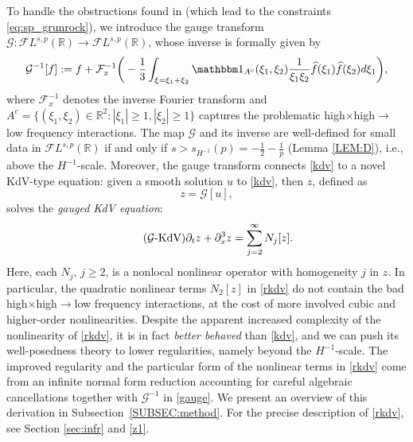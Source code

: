 \documentclass[a4paper,
11pt,  reqno]{amsart}
\newcommand{\5}{\textup{V}}
\newcommand{\FL}{\mathcal{F} L}
\newcommand{\ft}{\widehat}
\newcommand{\ind}{\mathbbm 1}
\theoremstyle{remark}
\newcommand{\R}{\mathbb{R}}
\newcommand{\Ft}{{\mathcal{F}}}
\newcommand{\Gc}{\mathcal{G}}
\numberwithin{equation}{section}
\numberwithin{theorem}{section}
\begin{document}
To handle the obstructions found in \cite{Grunrock_ldv_hier} (which lead to the constraints \eqref{eq:sp_grunrock}), we introduce the gauge transform $\Gc:\FL^{s,p}(\R) \to \FL^{s,p}(\R)$, whose inverse is formally given by
    \begin{equation}
\label{gauge}
\Gc^{-1}[f]
:= f + \Ft_x^{-1}\bigg( - \frac{1}{3} \int_{\xi=\xi_1+\xi_2} \ind_{A^c}(\xi_1,\xi_2) \frac{1}{\xi_1\xi_2} \ft{f}(\xi_1) \ft{f}(\xi_2) d\xi_1 \bigg),
    \end{equation}
    where $\Ft^{-1}_x$ denotes the inverse Fourier transform and
$A^c=\{(\xi_1,\xi_2)\in \R^2: |\xi_1|\ge 1, |\xi_2|\ge 1\}$ captures the problematic high$\times$high$\to$low frequency interactions.
The map $\Gc$ and its inverse are well-defined for small data in $\FL^{s,p}(\R)$ if and only if $s>s_{H^{-1}}(p)=-\frac12-\frac1p$ (Lemma \ref{LEM:D}), i.e., above the $H^{-1}$-scale.
    Moreover,
the gauge transform connects \eqref{kdv} to a novel KdV-type equation: given a smooth solution $u$ to \eqref{kdv}, then $z$, defined as
    \begin{equation}\label{defi_z_intro}
z=\mathcal{G}[u],
    \end{equation}
solves the \emph{gauged KdV equation}:
\begin{equation}
\label{rkdv}\tag{$\Gc$-KdV}
\partial_t z+ \partial_x^3 z =
\sum_{j=2}^\infty
N_j[z].
	\end{equation}
Here,
each $N_j$, $j\ge 2$, is a nonlocal nonlinear operator with homogeneity $j$ in $z$. In particular, the quadratic nonlinear terms $N_2[z]$ in \eqref{rkdv} do not contain the bad high$\times$high$\to$low frequency interactions, at the cost of more involved cubic and higher-order nonlinearities.
  Despite the apparent increased complexity of the nonlinearity of \eqref{rkdv}, it is in fact \emph{better behaved} than \eqref{kdv}, and we can push its well-posedness theory to lower regularities, namely beyond the $H^{-1}$-scale.
The improved regularity and the particular form of the nonlinear terms in \eqref{rkdv} come from an infinite normal form reduction
accounting for careful algebraic cancellations together with $\Gc^{-1}$ in \eqref{gauge}.
We present an overview of this derivation in Subsection~\ref{SUBSEC:method}. For the precise description of \eqref{rkdv}, see Section \ref{sec:infr} and \eqref{z1}.



\medskip
\end{document}
